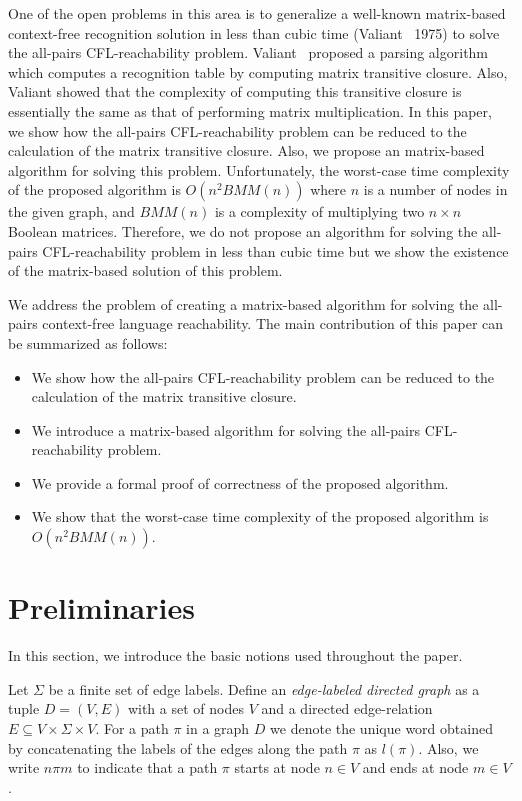 \documentclass[runningheads,a4paper]{llncs}
\begin{document}
One of the open problems in this area is to generalize a well-known matrix-based context-free recognition solution in less than cubic time (Valiant~\cite{valiant} 1975) to solve the all-pairs CFL-reachability problem. Valiant~\cite{valiant} proposed a parsing algorithm which computes a recognition table by computing matrix transitive closure. Also, Valiant showed that the complexity of computing this transitive closure is essentially the same as that of performing matrix multiplication. In this paper, we show how the all-pairs CFL-reachability problem can be reduced to the calculation of the matrix transitive closure. Also, we propose an matrix-based algorithm for solving this problem. Unfortunately, the worst-case time complexity of the proposed algorithm is $O(n^2BMM(n))$ where $n$ is a number of nodes in the given graph, and $BMM(n)$ is a complexity of multiplying two $n \times n$ Boolean matrices. Therefore, we do not propose an algorithm for solving the all-pairs CFL-reachability problem in less than cubic time but we show the existence of the matrix-based solution of this problem.

We address the problem of creating a matrix-based algorithm for solving the all-pairs context-free language reachability. The main contribution of this paper can be summarized as follows:
\begin{itemize}
	\item We show how the all-pairs CFL-reachability problem can be reduced to the calculation of the matrix transitive closure.
	\item We introduce a matrix-based algorithm for solving the all-pairs CFL-reachability problem.
	\item We provide a formal proof of correctness of the proposed algorithm.
	\item We show that the worst-case time complexity of the proposed algorithm is $O(n^2BMM(n))$.
\end{itemize}

\section{Preliminaries} \label{section_preliminaries}%
In this section, we introduce the basic notions used throughout the paper.

Let $\Sigma$ be a finite set of edge labels. Define an \textit{edge-labeled directed graph} as a tuple $D = (V, E)$ with a set of nodes $V$ and a directed edge-relation $E \subseteq V \times \Sigma \times V$.  For a path $\pi$ in a graph $D$ we denote the unique word obtained by concatenating the labels of the edges along the path $\pi$ as $l(\pi)$. Also, we write $n \pi m$ to indicate that a path $\pi$ starts at node $n \in V$ and ends at node $m \in V$.
\end{document}
